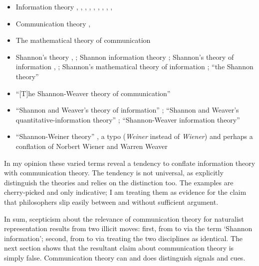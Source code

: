 \documentclass[12pt]{article}
\begin{document}
\begin{itemize}
    \item Information theory \citep[p. 3 passim]{adriaans2019information}, \citep[12]{shea2018representation}, \citep[614]{timpson2006grammar}, \citep[2]{baker2021natural}, \citep[3]{kirchhoff2021universal}, \citep[109]{dennett2017bacteria}, \citep[1]{isaac2018semantics}, \citep[8]{godfrey-smith2016biological}, \citep[p. 777 as ``this formal information theory'']{owren2010redefining}, \citep[p. 1991 as ``the theory of information'']{lombardi2015shannon}
    \item Communication theory \citep[592]{timpson2006grammar}, \citep[1987]{lombardi2015shannon}
    \item The mathematical theory of communication \citep[1988]{lombardi2015shannon}
    \item Shannon's theory \citep[2]{isaac2018semantics}, \citep[1984]{lombardi2015shannon}; Shannon information theory \citep[400]{lean2014shannon}; Shannon's theory of information \citep[p. 78, n. 5]{shea2018representation}, \citep[6]{isaac2018semantics}; Shannon's mathematical theory of information \citep[5, 106]{dennett2017bacteria}; ``the Shannon theory'' \citep[p. 599 n. 15]{timpson2006grammar}
    \item ``[T]he Shannon-Weaver theory of communication'' \citep[p. 756 n. 3]{owren2010redefining}
    \item ``Shannon and Weaver's \parencite*{shannon1949mathematical} theory of information'' \citep[759]{owren2010redefining}; ``Shannon and Weaver's quantitative-information theory'' \citep[761]{owren2010redefining}; ``Shannon-Weaver information theory'' \citep[344]{dennett1983intentional}
    \item ``Shannon-Weiner theory'' \citep[19]{baker2021natural}, a typo (\textit{Weiner} instead of \textit{Wiener}) and perhaps a conflation of Norbert Wiener and Warren Weaver
\end{itemize}

\noindent In my opinion these varied terms reveal a tendency to conflate information theory with communication theory.
The tendency is not universal, as \citet[17-20]{piccinini2011information} explicitly distinguish the theories and \citet{rathkopf2017neural} relies on the distinction too.
The examples are cherry-picked and only indicative; I am treating them as evidence for the claim that philosophers slip easily between \ait{} and \act{} without sufficient argument.

In sum, scepticism about the relevance of communication theory for naturalist representation results from two illicit moves: first, from \ami{} to \ait{} via the term `Shannon information'; second, from \ait{} to \act{} via treating the two disciplines as identical.
The next section shows that the resultant claim about communication theory is simply false.
Communication theory can and does distinguish signals and cues.
\end{document}
